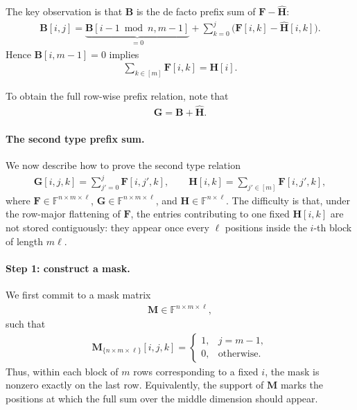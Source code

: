 The key observation is that $\mathbf{B}$ is the de facto prefix sum of
$\mathbf{F}-\widehat{\mathbf{H}}$:
\begin{align}
    \mathbf{B}[i,j]
    =
    \underbrace{\mathbf{B}[i-1\bmod n,m-1]}_{=0}
    +
    \sum_{k=0}^{j}\bigl(\mathbf{F}[i,k]-\widehat{\mathbf{H}}[i,k]\bigr).
\end{align}
Hence $\mathbf{B}[i,m-1]=0$ implies
\begin{align}
  \sum_{k\in[m]}\mathbf{F}[i,k]=\mathbf{H}[i].
\end{align}


To obtain the full row-wise prefix relation, note that
\begin{align}
  \mathbf{G} = \mathbf{B} + \widehat{\mathbf{H}}.
\end{align}

\paragraph{The second type prefix sum.}
We now describe how to prove the second type relation
\begin{align}
    \mathbf{G}[i,j,k]
    =
    \sum_{j'=0}^{j}\mathbf{F}[i,j',k],
    \qquad
    \mathbf{H}[i,k]
    =
    \sum_{j'\in[m]}\mathbf{F}[i,j',k],
\end{align}
where $\mathbf{F}\in\mathbb{F}^{n\times m\times \ell}$,
$\mathbf{G}\in\mathbb{F}^{n\times m\times \ell}$, and
$\mathbf{H}\in\mathbb{F}^{n\times \ell}$.
The difficulty is that, under the row-major flattening of
$\mathbf{F}$, the entries contributing to one fixed $\mathbf{H}[i,k]$ are not
stored contiguously: they appear once every $\ell$ positions inside the
$i$-th block of length $m\ell$.

\paragraph{Step 1: construct a mask.}
We first commit to a mask matrix
\begin{align}
    \mathbf{M}\in\mathbb{F}^{n\times m\times \ell},
\end{align}
such that
\begin{align}
    \mathbf{M}_{\{n\times m\times \ell\}}[i,j,k]
    =
    \begin{cases}
        1, & j=m-1,\\
        0, & \text{otherwise}.
    \end{cases}
\end{align}
Thus, within each block of $m$ rows corresponding to a fixed $i$, the mask is
nonzero exactly on the last row. Equivalently, the support of $\mathbf{M}$
marks the positions at which the full sum over the middle dimension should
appear.

